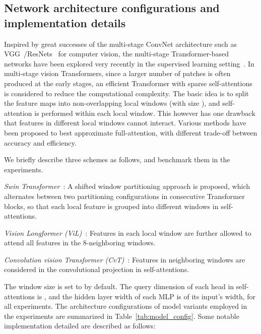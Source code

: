 \documentclass{article} \usepackage{iclr2022_conference,times}
\begin{document}
\subsection{Network architecture configurations and implementation details}
\vspace{-2mm}
Inspired by great successes of the multi-stage ConvNet architecture such as VGG~\citep{simonyan2014very}/ResNets~\citep{he2016deep} for computer vision, the multi-stage Transformer-based networks have been explored very recently in the supervised learning setting~\citep{vaswani2021scaling,wang2021pyramid,liu2021Swin,zhang2021vil,wu2021cvt}. 
In multi-stage vision Transformers, since a larger number of patches is often produced at the early stages, an efficient Transformer with sparse self-attentions is considered to reduce the computational complexity. The basic idea is to split the feature maps into non-overlapping local windows (with size ), and self-attention is performed within each local window. This however has one drawback that features in different local windows cannot interact. Various methods have been proposed to best approximate full-attention, with different trade-off between accuracy and efficiency.


We briefly describe three schemes as follows, and benchmark them in the experiments.
 
{\em Swin Transformer}~\citep{liu2021Swin}: A shifted window partitioning approach is proposed, which alternates between two partitioning configurations in consecutive Transformer blocks, so that each local feature is grouped into different windows in self-attentions.

{\em Vision Longformer (ViL)}~\citep{zhang2021vil}: Features in each local window are further allowed to attend all features in the 8-neighboring windows.

{\em  Convolution vision Transformer (CvT)}~\citep{wu2021cvt}: Features in neighboring windows are considered in the convolutional projection in self-attentions.


The window size is set to  by default. The query dimension of each head in self-attentions is , and the hidden layer width of
each MLP is  of its input's width, for all experiments. The architecture configurations of model variants employed in the experiments are summarized in Table~\ref{tab:model_config}. Some notable implementation detailed are described as follows:
\end{document}
